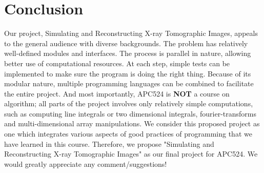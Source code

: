 \documentclass[11]{article}
\begin{document}
\section{Conclusion}
Our project, Simulating and Reconstructing X-ray Tomographic Images, appeals to the general audience with diverse backgrounds. The problem has relatively well-defined modules and interfaces. The process is parallel in nature, allowing better use of computational resources. At each step, simple tests can be implemented to make sure the program is doing the right thing. Because of its modular nature, multiple programming languages can be combined to facilitate the entire project. And most importantly, APC524 is \textbf{NOT} a course on algorithm; all parts of the project involves only relatively simple computations, such as computing line integrals or two dimensional integrals, fourier-transforms and multi-dimensional array manipulations. We consider this proposed project as one which integrates various aspects of good practices of programming that we have learned in this course. Therefore, we propose "Simulating and Reconstructing X-ray Tomographic Images" as our final project for APC524. We would greatly appreciate any comment/suggestions! 
\end{document}
